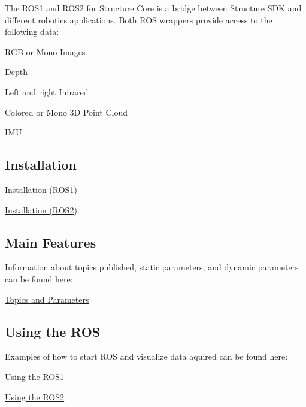 The R\+O\+S1 and R\+O\+S2 for Structure Core is a bridge between Structure S\+DK and different robotics applications. Both R\+OS wrappers provide access to the following data\+:


\begin{DoxyItemize}
\item R\+GB or Mono Images
\item Depth
\item Left and right Infrared
\item Colored or Mono 3D Point Cloud
\item I\+MU
\end{DoxyItemize}





\subsection*{Installation}


\begin{DoxyItemize}
\item \hyperlink{ros_install}{Installation (R\+O\+S1)}
\item \hyperlink{ros2_install}{Installation (R\+O\+S2)}
\end{DoxyItemize}

\subsection*{Main Features}

Information about topics published, static parameters, and dynamic parameters can be found here\+:


\begin{DoxyItemize}
\item \hyperlink{ros_main_features}{Topics and Parameters}
\end{DoxyItemize}

\subsection*{Using the R\+OS}

Examples of how to start R\+OS and visualize data aquired can be found here\+:


\begin{DoxyItemize}
\item \hyperlink{ros_start}{Using the R\+O\+S1}
\item \hyperlink{ros2_start}{Using the R\+O\+S2} 
\end{DoxyItemize}